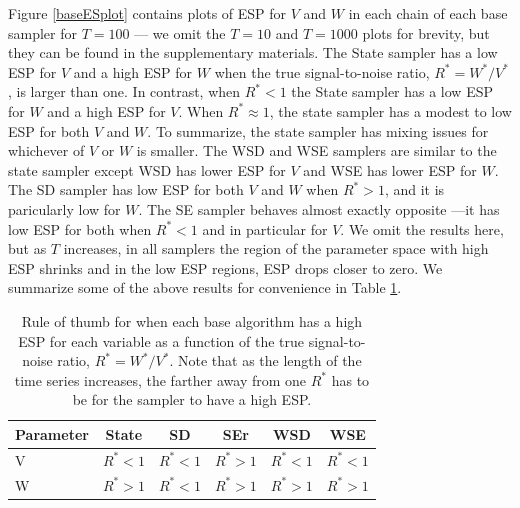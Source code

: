 \documentclass{article}
\begin{document}
Figure \ref{baseESplot} contains plots of ESP for $V$ and $W$ in each chain of each base sampler for $T=100$ --- we omit the $T=10$ and $T=1000$ plots for brevity, but they can be found in the supplementary materials. The State sampler has a low ESP for $V$ and a high ESP for $W$ when the true signal-to-noise ratio, $R^*=W^*/V^*$, is larger than one. In contrast, when $R^*<1$ the State sampler has a low ESP for $W$ and a high ESP for $V$. When $R^*\approx 1$, the state sampler has a modest to low ESP for both $V$ and $W$. To summarize, the state sampler has mixing issues for whichever of $V$ or $W$ is smaller. The WSD and WSE samplers are similar to the state sampler except WSD has lower ESP for $V$ and WSE has lower ESP for $W$. The SD sampler has low ESP for both $V$ and $W$ when $R^*>1$, and it is paricularly low for $W$. The SE sampler behaves almost exactly opposite ---it has low ESP for both when $R^*<1$ and in particular for $V$. We omit the results here, but as $T$ increases, in all samplers the region of the parameter space with high ESP shrinks and in the low ESP regions, ESP drops closer to zero. We summarize some of the above results for convenience in Table \ref{tab:stnmix}.
\begin{table}
  \centering
  \begin{tabular}{|l|ccccc|}\hline
    Parameter & State & SD & SEr & WSD & WSE \\\hline
    V & $R^* < 1$ & $R^* < 1$ & $R^* > 1$ & $R^* < 1$ & $R^* < 1$\\
    W & $R^* > 1$ & $R^* < 1$ & $R^* > 1$ & $R^* > 1$ & $R^* > 1$ \\\hline
  \end{tabular}
  \caption{Rule of thumb for when each base algorithm has a high ESP for each variable as a function of the true signal-to-noise ratio, $R^*=W^*/V^*$. Note that as the length of the time series increases, the farther away from one $R^*$ has to be for the sampler to have a high ESP.}
  \label{tab:stnmix}
\end{table}
\end{document}
